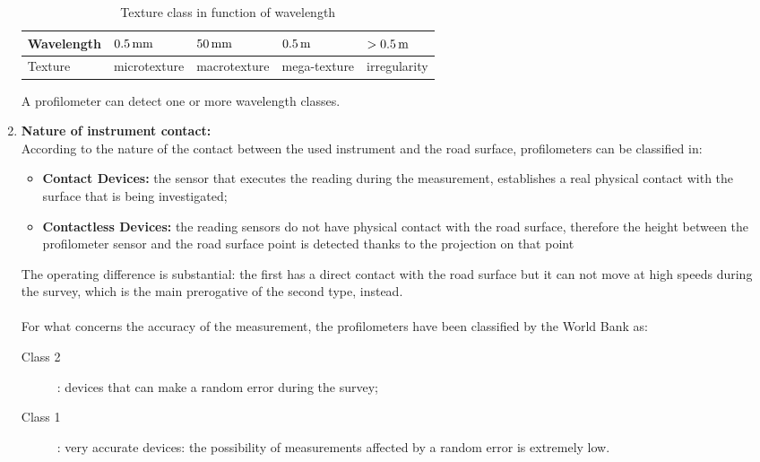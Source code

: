 \documentclass[tesi]{subfiles}
\begin{document}
\begin{enumerate}
\begin{table}[ht]
\centering
    \begin{tabular}{ | l | l | l | l | l |}

    \hline
    Wavelength & \quad $\num{0.5} \thinspace \si{\milli\meter}$ & \quad $\num{50} \thinspace \si{\milli\meter}$ & \quad $\num{0.5}\thinspace \si{\meter}$ & $ > \num{0.5} \thinspace \si{\meter} $  \\ \hline
   \quad  Texture & microtexture& macrotexture &mega-texture &	irregularity \\

\hline
    \end{tabular}
 \caption{Texture class in function of wavelength}
\end{table}

\noindent A profilometer can detect one or more wavelength classes.

\item \textbf{Nature of instrument contact:}\label{ssc:Instrument_Contact}\leavevmode\\
According to the nature of the contact between the used instrument and the road surface, profilometers can be classified in:
\begin{itemize}
\item \textbf{Contact Devices:} the sensor that executes the reading during the measurement, establishes a real physical contact with the surface that is being investigated;

\item \textbf{Contactless Devices:} the reading sensors do not have physical contact with the road surface, therefore the height between the profilometer sensor and the road surface point is detected thanks to the projection on that point
\end{itemize}
\noindent The operating difference is substantial: the first has a direct contact with the road surface but it can not move at high speeds during the survey, which is the main prerogative of the second type, instead. \\\\ \noindent For what concerns the accuracy of the measurement, the profilometers have been classified by the World Bank\cite{sayers1995calculation} as:
\begin{description}

	\item [Class 2]: devices that can make a random error during the survey;
	\item [Class 1]: very accurate devices: the possibility of measurements affected by a random error is extremely low.


\end{description}
\end{enumerate}
\end{document}
